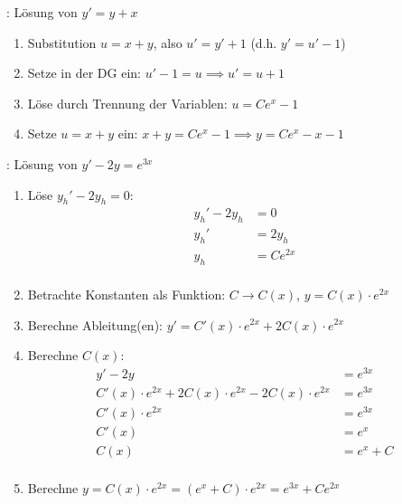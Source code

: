 \begin{minipage}{\linewidth}
\Bsp {}: Lösung von $y' = y + x$
\begin{enumerate}
    \item Substitution $u = x + y$, also $u' = y' + 1$ (d.h. $y' = u' - 1$)
    \item Setze in der DG ein: $u' - 1 = u \implies u' = u + 1$
    \item Löse durch Trennung der Variablen: $u = Ce^x - 1$
    \item Setze $u = x + y$ ein: $x + y = Ce^x - 1 \implies y = Ce^x - x - 1$
\end{enumerate}
\end{minipage}

\begin{minipage}{\linewidth}
\Bsp {}: Lösung von $y' - 2y = e^{3x}$
\begin{enumerate}
    \item Löse $y_h' - 2y_h = 0$:
        \begin{align*}
            y_h' - 2y_h &= 0 \\[-0.6em]
            y_h' &= 2y_h \\[-0.6em]
            y_h &= Ce^{2x} \\[-0.6em]
        \end{align*}
    \item Betrachte Konstanten als Funktion: $C \to C(x)$, $y = C(x) \cdot e^{2x}$
    \item Berechne Ableitung(en): $y' = C'(x) \cdot e^{2x} + 2 C(x) \cdot e^{2x}$
    \item Berechne $C(x)$:
        \vspace{-0.6em}
        \begin{align*}
            y' - 2y &= e^{3x} \\[-0.6em]
            C'(x) \cdot e^{2x} + 2 C(x) \cdot e^{2x} - 2C(x) \cdot e^{2x} &= e^{3x} \\[-0.6em]
            C'(x) \cdot e^{2x} &= e^{3x} \\[-0.6em]
            C'(x) &= e^x \\[-0.6em]
            C(x) &= e^x + C \\[-0.6em]
        \end{align*}
    \item Berechne $y = C(x) \cdot e^{2x} = (e^x + C) \cdot e^{2x} = e^{3x} + Ce^{2x}$
\end{enumerate}
\end{minipage}


